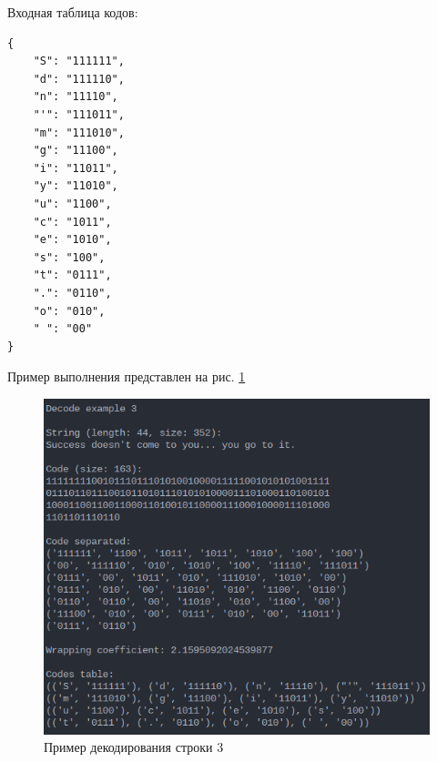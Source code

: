 Входная таблица кодов:\\ 
\begin{lstlisting}
{
    "S": "111111",
    "d": "111110",
    "n": "11110",
    "'": "111011",
    "m": "111010",
    "g": "11100",
    "i": "11011",
    "y": "11010",
    "u": "1100",
    "c": "1011",
    "e": "1010",
    "s": "100",
    "t": "0111",
    ".": "0110",
    "o": "010",
    " ": "00"
}
\end{lstlisting}

Пример выполнения представлен на рис. \ref{fig:decode_example_3}

\begin{figure}[H]
    \centering
    \includegraphics[width=0.7\linewidth]{photo/decode_example_3}
    \caption{Пример декодирования строки 3}
    \label{fig:decode_example_3}
\end{figure}

